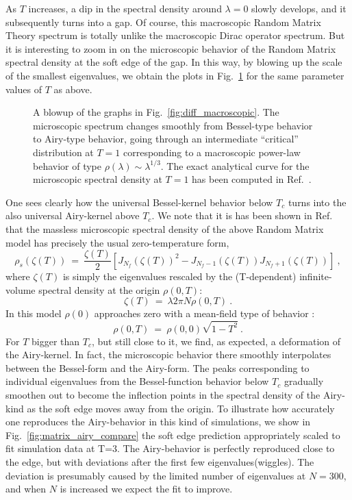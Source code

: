 \documentclass[11pt]{article}
\newcommand{\beq}{\begin{equation}}
\newcommand{\eeq}{\end{equation}}
\newcommand{\noi}{\vspace{12pt}\noindent}
\begin{document}
\noi
As $T$ increases, a dip in the spectral density around $\lambda = 0$ slowly
develops, and it subsequently turns into a gap. Of course, this macroscopic
Random Matrix Theory spectrum is totally unlike the macroscopic
Dirac operator spectrum. But it is interesting to zoom in on the microscopic
behavior of the Random Matrix spectral density at the soft edge of the
gap. In this way, by blowing up the scale of the smallest eigenvalues,
we obtain the plots in Fig.~\ref{fig:diff_microscopic} for the same 
parameter values of $T$ as above.
\begin{figure}
\begin{center}
\textwidth
{}
\end{center}
\vspace*{-2mm}
\caption{A blowup of the graphs in Fig.~\ref{fig:diff_macroscopic}. The 
microscopic spectrum changes smoothly from Bessel-type behavior to
Airy-type behavior, going through an intermediate ``critical'' 
distribution at $T=1$ corresponding to a macroscopic power-law behavior of
type $\rho(\lambda) \sim \lambda^{1/3}$. The exact analytical curve for the
microscopic spectral density at $T=1$ has been computed in
Ref.~\protect\cite{Z}.}
\label{fig:diff_microscopic}
\end{figure}
One sees clearly how the universal Bessel-kernel behavior below $T_c$
turns into the also universal Airy-kernel above $T_c$. We note that it is
has been shown in Ref.~\cite{JV} that the massless microscopic spectral
density of the above Random Matrix model has precisely the usual 
zero-temperature form,
\beq
\rho_s(\zeta(T)) ~=~ \frac{\zeta(T)}{2}\left[J_{N_{f}}(\zeta(T))^2
- J_{N_{f}-1}(\zeta(T))J_{N_{f}+1}(\zeta(T))\right] ~, 
\label{rhobessel}
\eeq
where $\zeta(T)$ is simply the eigenvalues rescaled by the (T-dependent) 
infinite-volume spectral density at the origin $\rho(0,T)$:
\beq
\zeta(T) ~=~ \lambda 2\pi N\rho(0,T) ~.
\eeq
In this model $\rho(0)$ approaches zero with a mean-field type of
behavior \cite{JV}:
\beq
\rho(0,T) ~=~ \rho(0,0)\sqrt{1 - T^2} ~.
\eeq
For $T$ bigger than $T_c$, but still close to it, we find, as expected,
a deformation of the Airy-kernel. In fact, the microscopic behavior
there smoothly interpolates between the Bessel-form and the Airy-form.
The peaks corresponding to individual eigenvalues from the Bessel-function
behavior below $T_c$ gradually smoothen out to become the inflection points
in the spectral density of the Airy-kind as the soft edge moves away from
the origin.
To illustrate how accurately one reproduces the Airy-behavior
in this kind of simulations, we show in 
Fig.~\ref{fig:matrix_airy_compare} the soft edge prediction appropriately 
scaled to fit simulation data at T=3.
The Airy-behavior is perfectly reproduced close to the edge, but with 
deviations after the first few eigenvalues(wiggles).  
The deviation is presumably caused by the limited number of eigenvalues
at $N=300$, and when $N$ is increased we expect the fit to improve.  
\end{document}
